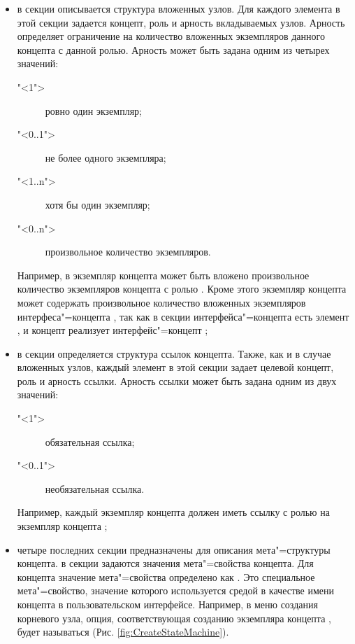 \begin{itemize}
 \item в секции  описывается структура вложенных узлов. Для каждого элемента в этой секции задается концепт,
роль и арность вкладываемых узлов. Арность определяет ограничение на количество вложенных экземпляров данного концепта с
данной ролью. Арность может быть задана одним из четырех значений:
\begin{description}
 \item["<1">] ровно один экземпляр;
 \item["<0..1">] не более одного экземпляра;
 \item["<1..n">] хотя бы один экземпляр;
 \item["<0..n">] произвольное количество экземпляров.
\end{description}
Например, в экземпляр концепта  может быть вложено произвольное количество экземпляров концепта 
 с ролью . Кроме этого экземпляр концепта  может содержать произвольное
количество вложенных экземпляров интерфеса"=концепта , так как в секции 
интерфейса"=концепта  есть элемент , и концепт 
 реализует интерфейс"=концепт ;

\item в секции  определяется структура ссылок концепта. Также, как и в случае вложенных узлов, каждый
элемент в этой секции задает целевой концепт, роль и арность ссылки. Арность ссылки может быть задана одним из двух значений:
\begin{description}
 \item["<1">] обязательная ссылка;
 \item["<0..1">] необязательная ссылка.
\end{description}
Например, каждый экземпляр концепта  должен иметь ссылку с ролью  на экземпляр
концепта ;

\item четыре последних секции предназначены для описания мета"=структуры концепта. в секции  задаются
значения мета"=свойства концепта. Для концепта  значение мета"=свойства  определено как 
. Это специальное мета"=свойство, значение которого используется средой \MPS{} в качестве имени концепта
в пользовательском интерфейсе. Например, в меню создания корневого узла, опция, соответствующая созданию экземпляра концепта
, будет называться  (Рис. \ref{fig:CreateStateMachine}).


\end{itemize}
